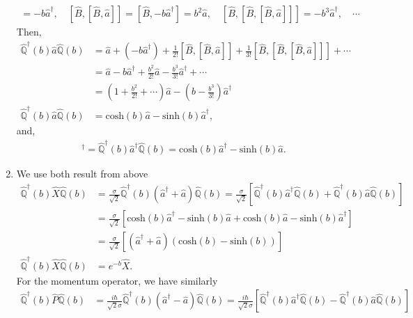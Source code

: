 \documentclass[letterpaper,11pt,twoside]{article}
\begin{document}
\begin{enumerate}[itemsep=0pt,topsep=0pt,label=\alph*)]
\begin{align*}
    [\hat{B},\hat{a}]=-b\hat{a}^\dagger,\quad[\hat{B},[\hat{B},\hat{a}]]=[\hat{B},-b\hat{a}^\dagger]=b^2\hat{a},\quad[\hat{B},[\hat{B},[\hat{B},\hat{a}]]]=-b^3\hat{a}^\dagger,\quad\cdots
  \end{align*}
  Then,
  \begin{align*}
    \hat{\mathbb{Q}}^\dagger(b)\hat{a}\hat{\mathbb{Q}}(b)&=\hat{a}+(-b\hat{a}^\dagger)+\frac{1}{2!}[\hat{B},[\hat{B},\hat{a}]]+\frac{1}{3!}[\hat{B},[\hat{B},[\hat{B},\hat{a}]]]+\cdots\\
    &=\hat{a}-b\hat{a}^\dagger+\frac{b^2}{2!}\hat{a}-\frac{b^3}{3!}\hat{a}^\dagger+\cdots\\
    &=\left(1+\frac{b^2}{2!}+\cdots\right)\hat{a}-\left(b-\frac{b^3}{3!}\right)\hat{a}^\dagger\\
    \hat{\mathbb{Q}}^\dagger(b)\hat{a}\hat{\mathbb{Q}}(b)&=\text{cosh}(b)\hat{a}-\text{sinh}(b)\hat{a}^\dagger,
  \end{align*}
  and,
  \begin{align*}
    [\hat{\mathbb{Q}}^\dagger(b)\hat{a}\hat{\mathbb{Q}}(b)]^\dagger=\hat{\mathbb{Q}}^\dagger(b)\hat{a}^\dagger\hat{\mathbb{Q}}(b)=\text{cosh}(b)\hat{a}^\dagger-\text{sinh}(b)\hat{a}.
  \end{align*}
  \item We use both result from above
  \begin{align*}
    \hat{\mathbb{Q}}^\dagger(b)\hat{X}\hat{\mathbb{Q}}(b)&=\frac{\sigma}{\sqrt{2}}\hat{\mathbb{Q}}^\dagger(b)(\hat{a}^\dagger+\hat{a})\hat{\mathbb{Q}}(b)=\frac{\sigma}{\sqrt{2}}\left[\hat{\mathbb{Q}}^\dagger(b)\hat{a}^\dagger\hat{\mathbb{Q}}(b)+\hat{\mathbb{Q}}^\dagger(b)\hat{a}\hat{\mathbb{Q}}(b)\right]\\
    &=\frac{\sigma}{\sqrt{2}}\left[\text{cosh}(b)\hat{a}^\dagger-\text{sinh}(b)\hat{a}+\text{cosh}(b)\hat{a}-\text{sinh}(b)\hat{a}^\dagger\right]\\
    &=\frac{\sigma}{\sqrt{2}}[(\hat{a}^\dagger+\hat{a})(\text{cosh}(b)-\text{sinh}(b))]\\
    \hat{\mathbb{Q}}^\dagger(b)\hat{X}\hat{\mathbb{Q}}(b)&=e^{-b}\hat{X}.
  \end{align*}
  For the momentum operator, we have similarly
  \begin{align*}
    \hat{\mathbb{Q}}^\dagger(b)\hat{P}\hat{\mathbb{Q}}(b)&=\frac{i\hbar}{\sqrt{2}\sigma}\hat{\mathbb{Q}}^\dagger(b)(\hat{a}^\dagger-\hat{a})\hat{\mathbb{Q}}(b)=\frac{i\hbar}{\sqrt{2}\sigma}\left[\hat{\mathbb{Q}}^\dagger(b)\hat{a}^\dagger\hat{\mathbb{Q}}(b)-\hat{\mathbb{Q}}^\dagger(b)\hat{a}\hat{\mathbb{Q}}(b)\right]\\

\end{align*}
\end{enumerate}
\end{document}
